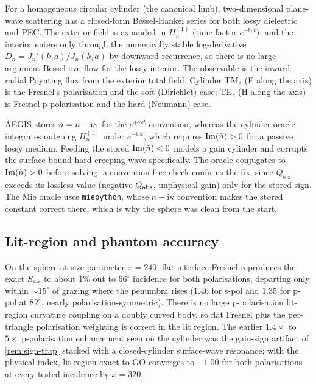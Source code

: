\begin{definition}\label{def:cyl-oracle}
For a homogeneous circular cylinder (the canonical limb), two-dimensional
plane-wave scattering has a closed-form Bessel-Hankel series for both lossy
dielectric and PEC. The exterior field is expanded in $H_n^{(1)}$ (time factor
$e^{-\mathrm{i}\omega t}$), and the interior enters only through the numerically
stable log-derivative $D_n = J_n'(k_1 a)/J_n(k_1 a)$ by downward recurrence, so
there is no large-argument Bessel overflow for the lossy interior. The
observable is the inward radial Poynting flux from the exterior total field.
Cylinder TM$_z$ (E along the axis) is the Fresnel s-polarisation and the soft
(Dirichlet) case; TE$_z$ (H along the axis) is Fresnel p-polarisation and the
hard (Neumann) case.
\end{definition}

\begin{remark}\label{rem:sign-trap}
AEGIS stores $\tilde{n} = n - \mathrm{i}\kappa$ for the $e^{+\mathrm{i}\omega t}$
convention, whereas the cylinder oracle integrates outgoing $H_n^{(1)}$ under
$e^{-\mathrm{i}\omega t}$, which requires $\operatorname{Im}(\tilde{n}) > 0$ for a passive lossy
medium. Feeding the stored $\operatorname{Im}(\tilde{n}) < 0$ models a gain cylinder and
corrupts the surface-bound hard creeping wave specifically. The oracle
conjugates to $\operatorname{Im}(\tilde{n}) > 0$ before solving; a convention-free check
confirms the fix, since $Q_{\mathrm{sca}}$ exceeds its lossless value (negative
$Q_{\mathrm{abs}}$, unphysical gain) only for the stored sign. The Mie oracle uses
\texttt{miepython}, whose $n - \mathrm{i}\kappa$ convention makes the stored
constant correct there, which is why the sphere was clean from the start.
\end{remark}

\subsection{Lit-region and phantom accuracy}
\label{sec:val-lit}

On the sphere at size parameter $x = 240$, flat-interface Fresnel reproduces the
exact $S_{\mathrm{ab}}$ to about $1\%$ out to $66^\circ$ incidence for both polarisations,
departing only within $\sim 15^\circ$ of grazing where the penumbra rises ($1.46$
for s-pol and $1.35$ for p-pol at $82^\circ$, nearly polarisation-symmetric).
There is no large p-polarisation lit-region curvature coupling on a doubly
curved body, so flat Fresnel plus the per-triangle polarisation weighting is
correct in the lit region. The earlier $1.4\times$ to $5\times$ p-polarisation
enhancement seen on the cylinder was the gain-sign artifact of
\cref{rem:sign-trap} stacked with a closed-cylinder surface-wave resonance; with
the physical index, lit-region exact-to-GO converges to $-1.00$ for both
polarisations at every tested incidence by $x = 320$.

